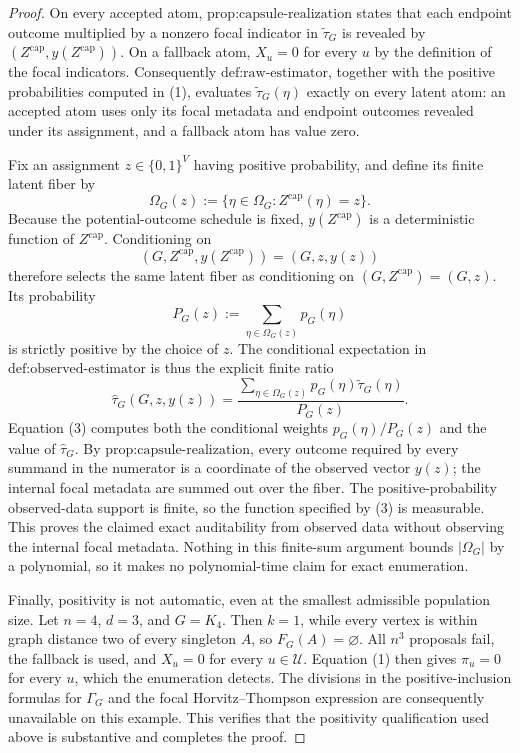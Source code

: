 \documentclass{article}
\begin{document}
\begin{proof}
On every accepted atom, \(\text{prop:capsule-realization}\) states that each endpoint outcome multiplied by a nonzero focal indicator in \(\widetilde\tau_G\) is revealed by \((Z^{\mathrm{cap}},y(Z^{\mathrm{cap}}))\). On a fallback atom, \(X_u=0\) for every \(u\) by the definition of the focal indicators. Consequently \(\text{def:raw-estimator}\), together with the positive probabilities computed in (1), evaluates \(\widetilde\tau_G(\eta)\) exactly on every latent atom: an accepted atom uses only its focal metadata and endpoint outcomes revealed under its assignment, and a fallback atom has value zero.

Fix an assignment \(z\in\{0,1\}^V\) having positive probability, and define its finite latent fiber by
\[
\Omega_G(z)
:=\bigl\{\eta\in\Omega_G:Z^{\mathrm{cap}}(\eta)=z\bigr\}.
\]
Because the potential-outcome schedule is fixed, \(y(Z^{\mathrm{cap}})\) is a deterministic function of \(Z^{\mathrm{cap}}\). Conditioning on
\[
(G,Z^{\mathrm{cap}},y(Z^{\mathrm{cap}}))=(G,z,y(z))
\]
therefore selects the same latent fiber as conditioning on \((G,Z^{\mathrm{cap}})=(G,z)\). Its probability
\[
P_G(z):=\sum_{\eta\in\Omega_G(z)}p_G(\eta)
\]
is strictly positive by the choice of \(z\). The conditional expectation in \(\text{def:observed-estimator}\) is thus the explicit finite ratio
\[
\widehat\tau_G(G,z,y(z))
=\frac{\displaystyle\sum_{\eta\in\Omega_G(z)}p_G(\eta)\widetilde\tau_G(\eta)}
{\displaystyle P_G(z)}.
\tag{3}
\]
Equation (3) computes both the conditional weights \(p_G(\eta)/P_G(z)\) and the value of \(\widehat\tau_G\). By \(\text{prop:capsule-realization}\), every outcome required by every summand in the numerator is a coordinate of the observed vector \(y(z)\); the internal focal metadata are summed out over the fiber. The positive-probability observed-data support is finite, so the function specified by (3) is measurable. This proves the claimed exact auditability from observed data without observing the internal focal metadata. Nothing in this finite-sum argument bounds \(\lvert\Omega_G\rvert\) by a polynomial, so it makes no polynomial-time claim for exact enumeration.

Finally, positivity is not automatic, even at the smallest admissible population size. Let \(n=4\), \(d=3\), and \(G=K_4\). Then \(k=1\), while every vertex is within graph distance two of every singleton \(A\), so \(F_G(A)=\varnothing\). All \(n^3\) proposals fail, the fallback is used, and \(X_u=0\) for every \(u\in\mathcal U\). Equation (1) then gives \(\pi_u=0\) for every \(u\), which the enumeration detects. The divisions in the positive-inclusion formulas for \(\Gamma_G\) and the focal Horvitz--Thompson expression are consequently unavailable on this example. This verifies that the positivity qualification used above is substantive and completes the proof.
\end{proof}
\end{document}
